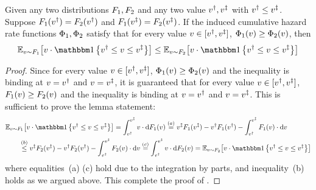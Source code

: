 \begin{lemma}
\label{lem:cum hazard rate monotonicity}
    Given any two distributions $F_1,F_2$ and any two value $v^\dagger, v^\ddagger$ with $v^\dagger \leq v^\ddagger$. 
    Suppose $F_1(v^\dagger) = F_2(v^\dagger)$ and $F_1(v^\ddagger) = F_2(v^\ddagger)$. If the induced cumulative hazard rate functions $\Phi_1,\Phi_2$ satisfy that for every value $v \in[v^\dagger,v^\ddagger]$,
    $\Phi_1(v) \geq \Phi_2(v)$,
    then 
    \begin{align*}
        \expect[\val\sim\buyerdist_1]{\val\cdot \indicator{\val\primed \leq \val\leq \val\doubleprimed}}
        \leq 
        \expect[\val\sim\buyerdist_2]{\val\cdot \indicator{\val\primed \leq \val\leq \val\doubleprimed}}
    \end{align*}
\end{lemma}
\begin{proof}
    Since for every value $v \in[v^\dagger,v^\ddagger]$,
    $\Phi_1(v) \geq \Phi_2(v)$ and the inequality is binding at $v = v^\dagger$ and $v = v^\ddagger$, it is guaranteed that for every value $v\in[v^\dagger,v^\ddagger]$, $F_1(v) \geq F_2(v)$
    and the inequality is binding at $v = v^\dagger$ and $v = v^\ddagger$. This is sufficient to prove the lemma statement:
    \begin{align*}
        &\expect[\val\sim\buyerdist_1]{\val\cdot \indicator{\val\primed \leq \val\leq \val\doubleprimed}} 
        =
        \displaystyle\int_{\val\primed}^{\val\doubleprimed}
        \val\cdot \d \buyercdf_1(\val) 
        \overset{(a)}{=}
        \val\doubleprimed \buyercdf_1(\val\doubleprimed)
        -
        \val\primed\buyercdf_1(\val\primed)
        -
        \displaystyle\int_{\val\primed}^{\val\doubleprimed}
        \buyercdf_1(\val) \cdot \d \val
        \\
        &\qquad\overset{(b)}{\leq}
        \val\doubleprimed \buyercdf_2(\val\doubleprimed)
        -
        \val\primed\buyercdf_2(\val\primed)
        -
        \displaystyle\int_{\val\primed}^{\val\doubleprimed}
        \buyercdf_2(\val) \cdot \d \val
        \overset{(c)}{=}  
        \displaystyle\int_{\val\primed}^{\val\doubleprimed}
        \val\cdot \d \buyercdf_2(\val) 
        =
        \expect[\val\sim\buyerdist_2]{\val\cdot \indicator{\val\primed \leq \val\leq \val\doubleprimed}} 
    \end{align*}
    where equalities~(a) (c) hold due to the integration by parts, and inequality~(b) holds as we argued above. This complete the proof of .
\end{proof}
